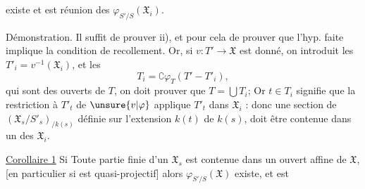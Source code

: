 existe et est réunion des $\varphi_{S'/S}(\mathfrak X_i)$.

Démonstration. Il suffit de prouver ii), et pour cela de prouver
que l'hyp. faite implique la condition de recollement. Or,
si $v:T'\to\mathfrak X$ est donné, on introduit les
$T'_i=v^{-1}(\mathfrak X_i)$, \deleted{$\unsure{-}$} et les
\[
T_i=\complement\varphi_T(T'-T'_i),
\]
qui sont des ouverts de $T$, on doit prouver que $T=\bigcup T_i$;
Or $t\in T_i$ signifie que la restriction à $T'_t$ de $\unsure{v|\varphi}$ applique
$T'_t$ dans $\mathfrak X_i$ : donc une section de
$(\mathfrak X_s/S'_s)_{/k(s)}$ définie sur l'extension $k(t)$ de $k(s)$,
doit être contenue dans un des $\mathfrak X_i$.

\uline{Corollaire 1} Si Toute partie  finie
 d'un $\mathfrak X_s$ est contenue
dans un ouvert affine de $\mathfrak X$, 
[en particulier si   est
quasi-projectif] alors $\varphi_{S'/S}(\mathfrak X)$ existe, et est
